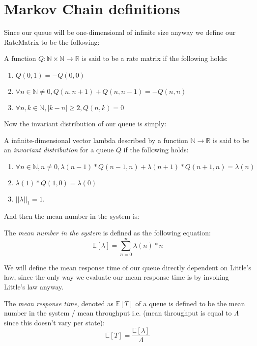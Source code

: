 \section{Markov Chain definitions}

Since our queue will be one-dimensional of infinite size anyway we define our RateMatrix to be the following:
\begin{definition}\label{def:RateMatrix}\leanok
    A function $Q \colon \mathbb{N} \times \mathbb{N} \to \mathbb{R}$ is said to be a rate matrix
    if the following holds:
    \begin{enumerate}
      \item $Q(0,1) = -Q(0,0)$
      \item $\forall n \in \mathbb{N} \neq 0, Q(n, n+1) + Q(n, n-1) = -Q(n,n)$
      \item $\forall n, k \in \mathbb{N}, |k-n| \geq 2, Q(n,k) = 0$
    \end{enumerate}
\end{definition}

Now the invariant distribution of our queue is simply:
\begin{definition}\label{def:InvariantDistribution}\leanok
    A infinite-dimensional vector lambda described by a function $\mathbb{N} \to \mathbb{R}$ is said
    to be an \textit{invariant distribution} for a queue $Q$ if the following holds:\
    \begin{enumerate}
        \item $\forall n \in \mathbb{N}, n \neq 0, \lambda(n-1) * Q(n-1,n) + \lambda(n+1) * Q(n+1,n) = \lambda(n)$
        \item $\lambda(1) * Q(1,0) = \lambda(0)$
        \item $||\lambda||_1 = 1$.
    \end{enumerate}
\end{definition}

And then the mean number in the system is:
\begin{definition}\label{def:MeanLambda}\leanok
    The \textit{mean number in the system} is defined as the following equation:
    $$\mathbb{E}[\lambda] = \sum_{n=0}^\infty \lambda(n)*n$$
\end{definition}

We will define the mean response time of our queue directly dependent on Little's law, since the only
way we evaluate our mean response time is by invoking Little's law anyway.
\begin{definition}\label{def:MeanResponseTime}\uses{def:MeanLambda}\leanok
    The \textit{mean response time}, denoted as $\mathbb{E}[T]$ of a queue is defined to be the mean
    number in the system / mean throughput i.e. (mean throughput is equal to $\Lambda$ since this doesn't vary
    per state):
    $$\mathbb{E}[T] = \frac{\mathbb{E}[\lambda]}{\Lambda}$$
\end{definition}

